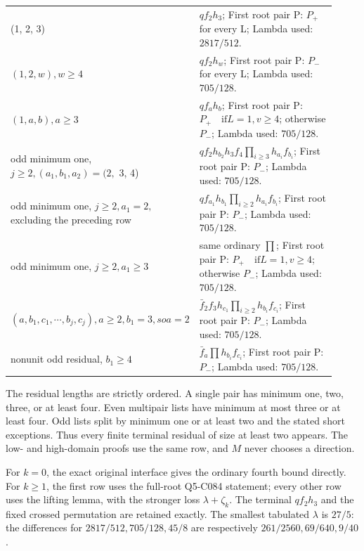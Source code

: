 \begin{longtable}{@{}p{0.2200\linewidth}p{0.7000\linewidth}@{}}
(1, 2, 3) & \(qf_2 h_3\); First root pair P: \(P_+\) for every L; Lambda used: \(2817/512\). \\
\addlinespace[2pt]
\((1,\allowbreak 2,\allowbreak w),\allowbreak w\ge 4\) & \(qf_2 h_w\); First root pair P: \(P_-\) for every L; Lambda used: \(705/128\). \\
\addlinespace[2pt]
\((1,\allowbreak a,\allowbreak b),\allowbreak a\ge 3\) & \(qf_a h_b\); First root pair P: \(P_+ \quad\text{if} L=1,\allowbreak  v\ge 4\); otherwise \(P_-\); Lambda used: \(705/128\). \\
\addlinespace[2pt]
odd minimum one, \(j\ge 2,\allowbreak (a_1,\allowbreak  b_1,\allowbreak  a_2)=(2,\allowbreak \) 3, 4) & \(qf_2 h_{b_2}h_3 f_4 \prod_{i\ge 3}h_{a_i}f_{b_i}\); First root pair P: \(P_-\); Lambda used: \(705/128\). \\
\addlinespace[2pt]
odd minimum one, \(j\ge 2,\allowbreak  a_1=2,\allowbreak \) excluding the preceding row & \(qf_{a_1}h_{b_1} \prod_{i\ge 2}h_{a_i}f_{b_i}\); First root pair P: \(P_-\); Lambda used: \(705/128\). \\
\addlinespace[2pt]
odd minimum one, \(j\ge 2,\allowbreak  a_1\ge 3\) & same ordinary \(\prod\); First root pair P: \(P_+ \quad\text{if} L=1,\allowbreak  v\ge 4\); otherwise \(P_-\); Lambda used: \(705/128\). \\
\addlinespace[2pt]
\((a,\allowbreak b_1,\allowbreak c_1,\allowbreak \cdots,\allowbreak b_j,\allowbreak c_j),\allowbreak a\ge 2,\allowbreak b_1=3,\allowbreak so a=2\) & \(\bar f_2 f_3 h_{c_1} \prod_{i\ge 2}h_{b_i}f_{c_i}\); First root pair P: \(P_-\); Lambda used: \(705/128\). \\
\addlinespace[2pt]
nonunit odd residual, \(b_1\ge 4\) & \(\bar f_a \prod h_{b_i}f_{c_i}\); First root pair P: \(P_-\); Lambda used: \(705/128\). \\
\end{longtable}
\endgroup


The residual lengths are strictly ordered. A single pair has minimum one, two, three, or at least four. Even multipair lists have minimum at most three or at least four. Odd lists split by minimum one or at least two and the stated short exceptions. Thus every finite terminal residual of size at least two appears. The low- and high-domain proofs use the same row, and \(M\) never chooses a direction.

For \(k=0\), the exact original interface gives the ordinary fourth bound directly. For \(k\ge1\), the first row uses the full-root Q5-C084 statement; every other row uses the lifting lemma, with the stronger loss \(\lambda+\zeta_k\). The terminal \(qf_2h_3\) and the fixed crossed permutation are retained exactly. The smallest tabulated \(\lambda\) is \(27/5\): the differences for \(2817/512,\allowbreak \allowbreak  705/128,\allowbreak \allowbreak  45/8\) are respectively \(261/2560,\allowbreak \allowbreak  69/640,\allowbreak \allowbreak  9/40\).

